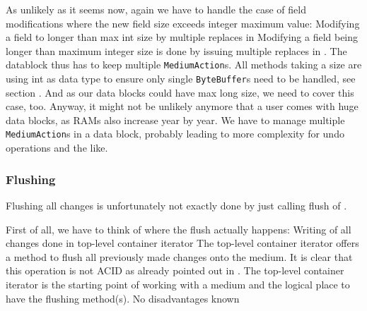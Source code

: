 As unlikely as it seems now, again we have to handle the case of field modifications where the new field size exceeds integer maximum value:
{%
Modifying a field to longer than max int size by multiple replaces in \COMPmedia{}
}
{%
Modifying a field being longer than maximum integer size is done by issuing multiple replaces in \COMPmedia{}. The datablock thus has to keep multiple \texttt{MediumAction}s.
}
{%
All \COMPmedia{} methods taking a size are using int as data type to ensure only single \texttt{ByteBuffer}s need to be handled, see section . And as our data blocks could have max long size, we need to cover this case, too. Anyway, it might not be unlikely anymore that a user comes with huge data blocks, as RAMs also increase year by year.
}
{%
We have to manage multiple \texttt{MediumAction}s in a data block, probably leading to more complexity for undo operations and the like.
}

\subsubsection{Flushing}%
\label{sec:Flushing}%

Flushing all changes is unfortunately not exactly done by just calling flush of \COMPmedia{}.

First of all, we have to think of where the flush actually happens:
{%
Writing of all changes done in top-level container iterator
}
{%
The top-level container iterator offers a method to flush all previously made changes onto the medium. It is clear that this operation is not ACID as already pointed out in .
}
{%
The top-level container iterator is the starting point of working with a medium and the logical place to have the flushing method(s).
}
{%
No disadvantages known
}

